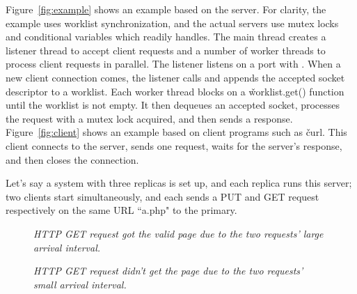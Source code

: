Figure~\ref{fig:example} shows an example based on the \apache \http server. For 
clarity, the example uses worklist synchronization, and the actual servers use 
\pthread mutex locks and conditional variables which \xxx readily handles. The 
main thread creates a listener thread to accept client requests and a number 
of worker threads to process client requests in parallel. The listener listens 
on a port with \poll. When a new client connection comes, the 
listener calls \accept and appends the accepted socket descriptor to a 
worklist. Each worker thread blocks on a \v{worklist.get()} function until 
the worklist is not empty. It then dequeues an accepted socket, processes the 
request with a mutex lock acquired, and then sends a response. 
Figure~\ref{fig:client} shows an example based on client programs such as 
\v{curl}. This client connects to the server, sends one \http request, waits for 
the server's response, and then closes the connection.

Let's say a \xxx system with three replicas is set up, and each replica runs 
this server; two clients start simultaneously, and each sends a \http PUT 
and GET request respectively on the same URL ``a.php" to the primary.



\begin{figure}[t]
\centering
\begin{minipage}{.5\textwidth}
\end{minipage}
\vspace{-.1in}
\caption{{\em HTTP GET request got the valid page due to the two requests' 
large arrival interval.}} \label{fig:yes-page}
\vspace{-.2in}
\end{figure}

\begin{figure}[t]
\centering
\begin{minipage}{.5\textwidth}
\end{minipage}
\vspace{-.1in}
\caption{{\em HTTP GET request didn't get the page due to the two requests'
small arrival interval.}} \label{fig:no-page}
\vspace{-.05in}
\end{figure}



